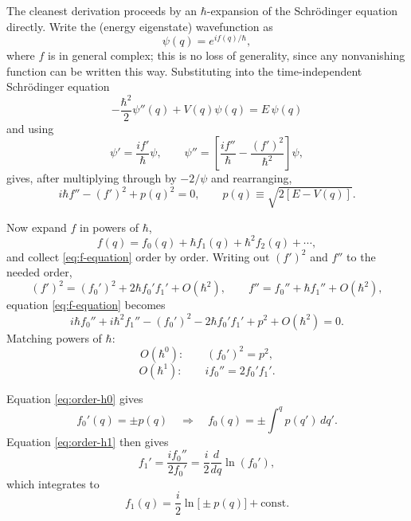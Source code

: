The cleanest derivation proceeds by an $\hbar$-expansion of the Schr\"odinger equation directly. Write the (energy eigenstate) wavefunction as
\begin{equation}
\psi(q) = e^{if(q)/\hbar},
\label{eq:wkb-ansatz}
\end{equation}
where $f$ is in general complex; this is no loss of generality, since any nonvanishing function can be written this way. Substituting into the time-independent Schr\"odinger equation
\begin{equation}
-\frac{\hbar^2}{2}\psi''(q) + V(q)\psi(q) = E\,\psi(q)
\label{eq:schrodinger}
\end{equation}
and using
\begin{equation}
\psi' = \frac{if'}{\hbar}\psi, \qquad \psi'' = \left[\frac{if''}{\hbar} - \frac{(f')^2}{\hbar^2}\right]\psi,
\label{eq:psi-derivatives}
\end{equation}
gives, after multiplying through by $-2/\psi$ and rearranging,
\begin{equation}
i\hbar f'' - (f')^2 + p(q)^2 = 0, \qquad p(q) \equiv \sqrt{2[E-V(q)]}.
\label{eq:f-equation}
\end{equation}

Now expand $f$ in powers of $\hbar$,
\begin{equation}
f(q) = f_0(q) + \hbar f_1(q) + \hbar^2 f_2(q) + \cdots,
\label{eq:f-expansion}
\end{equation}
and collect \eqref{eq:f-equation} order by order. Writing out $(f')^2$ and $f''$ to the needed order,
\begin{equation}
(f')^2 = (f_0')^2 + 2\hbar f_0' f_1' + O(\hbar^2), \qquad f'' = f_0'' + \hbar f_1'' + O(\hbar^2),
\label{eq:expansion-pieces}
\end{equation}
equation \eqref{eq:f-equation} becomes
\begin{equation}
i\hbar f_0'' + i\hbar^2 f_1'' - (f_0')^2 - 2\hbar f_0' f_1' + p^2 + O(\hbar^2) = 0.
\label{eq:f-equation-expanded}
\end{equation}
Matching powers of $\hbar$:
\begin{equation}
O(\hbar^0): \qquad (f_0')^2 = p^2,
\label{eq:order-h0}
\end{equation}
\begin{equation}
O(\hbar^1): \qquad i f_0'' = 2 f_0' f_1'.
\label{eq:order-h1}
\end{equation}

Equation \eqref{eq:order-h0} gives
\begin{equation}
f_0'(q) = \pm p(q) \quad\Longrightarrow\quad f_0(q) = \pm\int^q p(q')\,dq'.
\label{eq:f0-solution}
\end{equation}
Equation \eqref{eq:order-h1} then gives
\begin{equation}
f_1' = \frac{i f_0''}{2 f_0'} = \frac{i}{2}\frac{d}{dq}\ln(f_0'),
\label{eq:f1-prime}
\end{equation}
which integrates to
\begin{equation}
f_1(q) = \frac{i}{2}\ln\big[\pm p(q)\big] + \text{const}.
\label{eq:f1-solution}
\end{equation}

